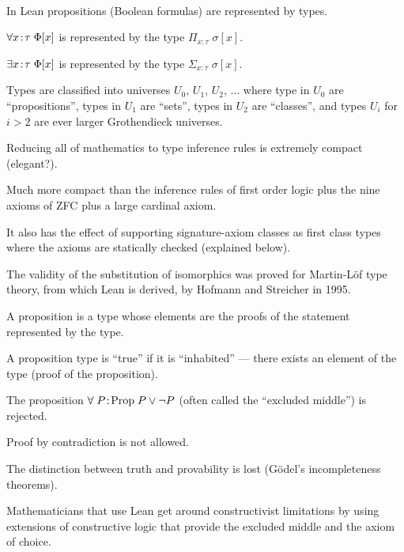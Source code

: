 {~ \hfill\unnamed
    {
    }{
      }
\hfill ~


In Lean propositions (Boolean formulas) are represented by types.

\vfill
$\forall x\!:\!\tau \;\Phi[x]$ is represented by the type $\Pi_{x:\tau}\;\sigma[x]$.

\vfill
$\exists x\!:\!\tau \;\Phi[x]$ is represented by the type $\Sigma_{x:\tau}\;\sigma[x]$.

\vfill
Types are classified into universes $U_0$, $U_1$, $U_2$, $\ldots$ where type in $U_0$ are ``propositions'',
types in $U_1$ are ``sets'', types in $U_2$ are ``classes'', and types $U_i$ for $i > 2$ are ever larger Grothendieck universes.


\vfill
Reducing all of mathematics to type inference rules is extremely compact (elegant?).

\vfill
Much more compact than the inference rules of first order logic plus the nine axioms of ZFC plus a large cardinal axiom.

\vfill
It also has the effect of supporting signature-axiom classes as first class types where the axioms are statically checked (explained below).

\vfill
The validity of the substitution of isomorphics was proved for Martin-L\"{o}f type theory, from which Lean is derived, by Hofmann and Streicher in 1995.

A proposition is a type whose elements are the proofs of the statement represented by the type.

\vfill
A proposition type is ``true'' if it is ``inhabited'' ---
there exists an element of the type (proof of the proposition).

\vfill
The proposition $\forall\;P\!:\!\mathrm{Prop}\;P \vee \neg P$ (often called the ``excluded middle'') is rejected.

\vfill
Proof by contradiction is not allowed.

\vfill
The distinction between truth and provability is lost (G\"{o}del's incompleteness theorems).


Mathematicians that use Lean get around constructivist limitations by using extensions of constructive logic that provide
the excluded middle and the axiom of choice.

}
